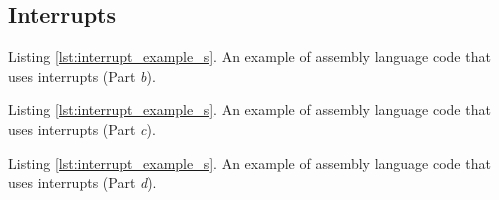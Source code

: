 \subsection{Interrupts}


\begin{center} \begin{minipage}[h]{16.5 cm}

\end{minipage} \end{center}

\newpage
\begin{center} \begin{minipage}[h]{15 cm}
\expandparam

\end{minipage} \end{center}
\begin{center}
Listing \ref{lst:interrupt_example_s}. An example of assembly language code that uses
interrupts (Part {\it b}).
\end{center}

\newpage
\begin{center} \begin{minipage}[h]{15 cm}
\expandparam

\end{minipage} \end{center}
\begin{center}
Listing \ref{lst:interrupt_example_s}. An example of assembly language code that uses
interrupts (Part {\it c}).
\end{center}

\newpage
\begin{center} \begin{minipage}[h]{16 cm}
\expandparam

\end{minipage} \end{center}
\begin{center}
Listing \ref{lst:interrupt_example_s}. An example of assembly language code that uses
interrupts (Part {\it d}).
\end{center}

